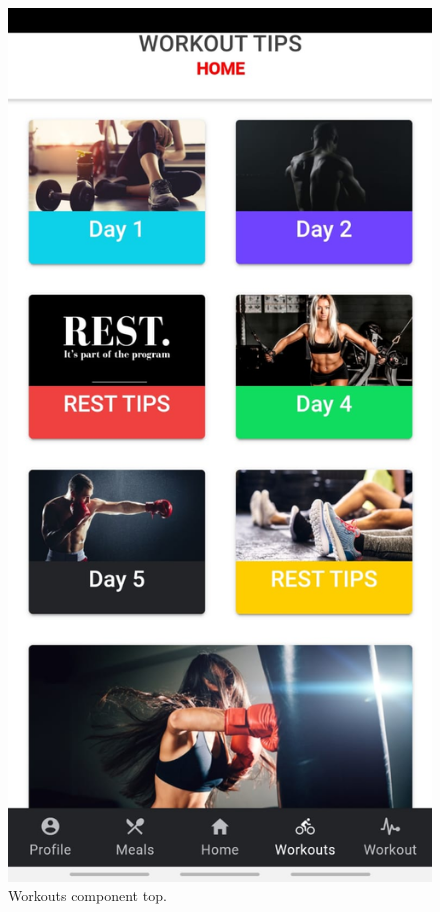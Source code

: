 \documentclass[a4paper,12pt]{report}
\begin{document}
\begin{figure}[ht] 
  \label{ fig7} 
  \begin{minipage}[b]{0.5\linewidth}
    \centering
    \includegraphics[width=.7\linewidth]{images/aplicationImages/workoutTop.jpeg} 
    \caption{Workouts component top.} 
    \vspace{4ex}
  \end{minipage}%
  \begin{minipage}[b]{0.5\linewidth}
    \centering

\end{minipage}
\end{figure}
\end{document}
